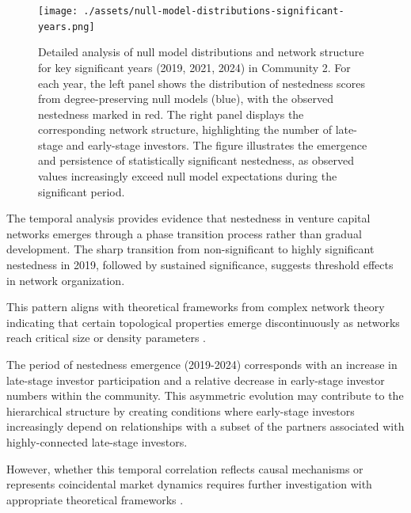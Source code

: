 \begin{figure}[htbp]
\centering
\texttt{[image: ./assets/null-model-distributions-significant-years.png]}
\caption{Detailed analysis of null model distributions and network structure for key significant years (2019, 2021, 2024) in Community 2. For each year, the left panel shows the distribution of nestedness scores from degree-preserving null models (blue), with the observed nestedness marked in red. The right panel displays the corresponding network structure, highlighting the number of late-stage and early-stage investors. The figure illustrates the emergence and persistence of statistically significant nestedness, as observed values increasingly exceed null model expectations during the significant period.}
\label{fig:null_model_distributions_significant_years}
\end{figure}

The temporal analysis provides evidence that nestedness in venture capital networks emerges through a phase transition process rather than gradual development. The sharp transition from non-significant to highly significant nestedness in 2019, followed by sustained significance, suggests threshold effects in network organization. 

This pattern aligns with theoretical frameworks from complex network theory indicating that certain topological properties emerge discontinuously as networks reach critical size or density parameters \cite{Mariani2019}.


The period of nestedness emergence (2019-2024) corresponds with an increase in late-stage investor participation and a relative decrease in early-stage investor numbers within the community. This asymmetric evolution may contribute to the hierarchical structure by creating conditions where early-stage investors increasingly depend on relationships with a subset of the partners associated with highly-connected late-stage investors. 


However, whether this temporal correlation reflects causal mechanisms or represents coincidental market dynamics requires further investigation with appropriate theoretical frameworks \cite{Dalle2025}.

